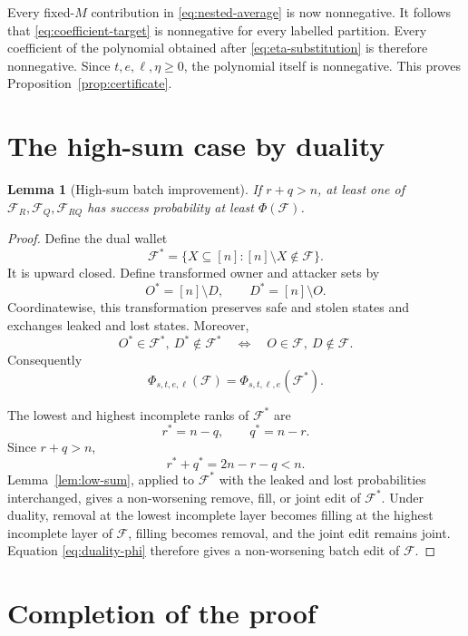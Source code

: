 \documentclass[11pt]{article}
\newtheorem{lemma}[theorem]{Lemma}
\newcommand{\cF}{\mathcal F}
\newcommand{\1}{\mathbf 1}
\begin{document}
Every fixed-$M$ contribution in \eqref{eq:nested-average} is now
nonnegative.  It follows that \eqref{eq:coefficient-target} is
nonnegative for every labelled partition.  Every coefficient of the
polynomial obtained after \eqref{eq:eta-substitution} is therefore
nonnegative.  Since $t,e,\ell,\eta\geq0$, the polynomial itself is
nonnegative.  This proves Proposition~\ref{prop:certificate}.

\section{The high-sum case by duality}

\begin{lemma}[High-sum batch improvement]\label{lem:high-sum}
If $r+q>n$, at least one of $\cF_R,\cF_Q,\cF_{RQ}$ has success
probability at least $\Phi(\cF)$.
\end{lemma}

\begin{proof}
Define the dual wallet
\[
\cF^\ast
=\{X\subseteq[n]:[n]\setminus X\notin\cF\}.
\]
It is upward closed.  Define transformed owner and attacker sets by
\[
O^\ast=[n]\setminus D,
\qquad
D^\ast=[n]\setminus O.
\]
Coordinatewise, this transformation preserves safe and stolen states
and exchanges leaked and lost states.  Moreover,
\[
O^\ast\in\cF^\ast,\ D^\ast\notin\cF^\ast
\quad\Longleftrightarrow\quad
O\in\cF,\ D\notin\cF.
\]
Consequently
\begin{equation}\label{eq:duality-phi}
\Phi_{s,t,e,\ell}(\cF)
=\Phi_{s,t,\ell,e}(\cF^\ast).
\end{equation}

The lowest and highest incomplete ranks of $\cF^\ast$ are
\[
r^\ast=n-q,
\qquad
q^\ast=n-r.
\]
Since $r+q>n$,
\[
r^\ast+q^\ast=2n-r-q<n.
\]
Lemma~\ref{lem:low-sum}, applied to $\cF^\ast$ with the leaked and lost
probabilities interchanged, gives a non-worsening remove, fill, or
joint edit of $\cF^\ast$.  Under duality, removal at the lowest
incomplete layer becomes filling at the highest incomplete layer of
$\cF$, filling becomes removal, and the joint edit remains joint.
Equation \eqref{eq:duality-phi} therefore gives a non-worsening batch
edit of $\cF$.
\end{proof}

\section{Completion of the proof}
\end{document}
